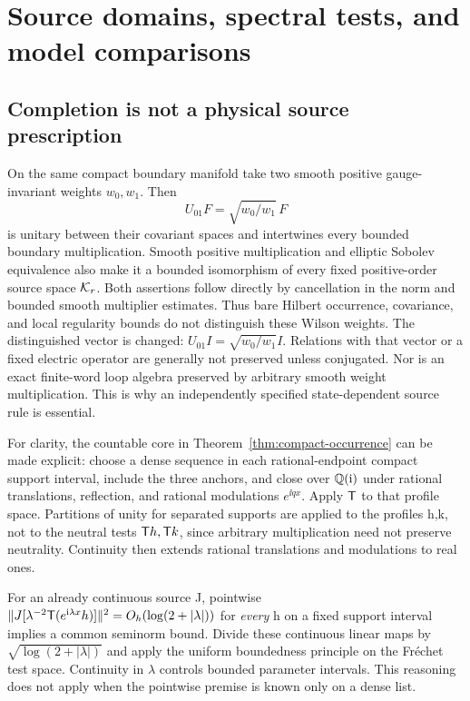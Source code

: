 \section{Source domains, spectral tests, and model comparisons}\label{app:comparisons}
\subsection{Completion is not a physical source prescription}
On the same compact boundary manifold take two smooth
positive gauge-invariant weights $w_0,w_1$. Then
\begin{equation}
U_{01}F=\sqrt{w_0/w_1}\,F
\end{equation}
is unitary between their covariant \Ltwo{} spaces and
intertwines every bounded boundary multiplication.
Smooth positive multiplication and elliptic Sobolev
equivalence also make it a bounded isomorphism of every
fixed positive-order source space $\mathcal K_r$.
Both assertions follow directly by cancellation in
the norm and bounded smooth multiplier estimates.
Thus bare Hilbert occurrence, covariance, and local
regularity bounds do not distinguish these Wilson
weights. The distinguished vector is changed:
$U_{01}I=\sqrt{w_0/w_1}I$. Relations with that vector
or a fixed electric operator are generally not preserved
unless conjugated. Nor is an exact finite-word loop
algebra preserved by arbitrary smooth weight multiplication.
This is why an independently specified state-dependent
source rule is essential.

For clarity, the countable core in
Theorem~\ref{thm:compact-occurrence} can be made explicit:
choose a dense sequence in each rational-endpoint
compact support interval, include the three anchors,
and close over $\mathbb Q(\mathrm i)$ under rational translations,
reflection, and rational modulations $e^{\ii qx}$.
Apply $\mathsf T$ to that profile space. Partitions of unity
for separated supports are applied to the profiles
h,k, not to the neutral tests $\mathsf T h,\mathsf T k$, since
arbitrary multiplication need not preserve neutrality.
Continuity then extends rational translations and
modulations to real ones.

For an already continuous source J, pointwise
$\lVert J[\lambda^{-2}\mathsf T(e^{\mathrm i\lambda x}h)]\rVert^2
=O_h(\log(2+|\lambda|))$ for \emph{every} h on a fixed
support interval implies a common seminorm bound.
Divide these continuous linear maps by
$\sqrt{\log(2+|\lambda|)}$ and apply the uniform
boundedness principle on the Fr\'echet test space.
Continuity in $\lambda$ controls bounded parameter
intervals. This reasoning does not apply when the
pointwise premise is known only on a dense list.

